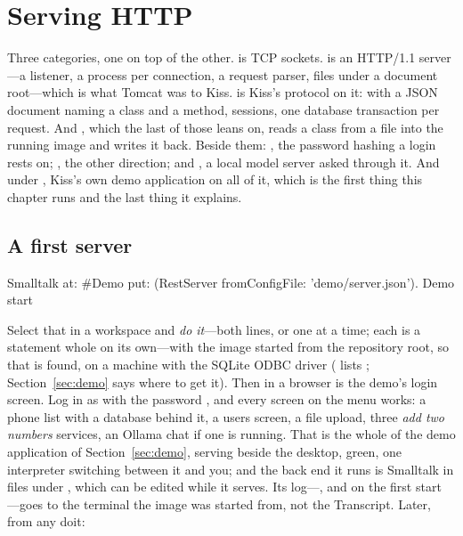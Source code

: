 \chapter{Serving HTTP}
\label{ch:serving}


Three categories, one on top of the other.  is TCP sockets.
 is an HTTP/1.1 server---a listener, a process per
connection, a request parser, files under a document root---which is what
Tomcat was to Kiss.  is Kiss's protocol on it: 
with a JSON document naming a class and a method, sessions, one database
transaction per request. And , which the last of those leans on,
reads a class from a file into the running image and writes it back.
Beside them: , the password hashing a login rests on;
, the other direction; and , a local model server
asked through it. And under , Kiss's own demo application on all
of it, which is the first thing this chapter runs and the last thing it
explains.

\section{A first server}
\label{sec:first-server}

\begin{st}
Smalltalk at: #Demo put: (RestServer fromConfigFile: 'demo/server.json').
Demo start
\end{st}

Select that in a workspace and \emph{do it}---both lines, or one at a
time; each is a statement whole on its own---with the image started from
the repository root, so that  is found, on a machine with the
SQLite ODBC driver ( lists \ct{[SQLITE3]};
Section~\ref{sec:demo} says where to get it). Then
 in a browser is the demo's login screen. Log in as
 with the password , and every screen on the menu
works: a phone list with a database behind it, a users screen, a file
upload, three \emph{add two numbers} services, an Ollama chat if one is
running. That is the whole of the demo application of
Section~\ref{sec:demo}, serving beside the desktop, green, one interpreter
switching between it and you; and the back end it runs is Smalltalk in
files under , which can be edited while it serves. Its
log---, and on the first start
---goes to the terminal
the image was started from, not the Transcript. Later, from any doit:

